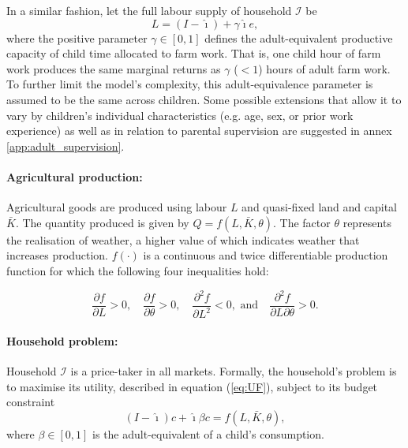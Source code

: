 \documentclass[a4paper,12pt]{article}
\theoremstyle{plain}
\theoremstyle{definition}
\theoremstyle{definition}
\theoremstyle{definition}
\theoremstyle{definition}
\begin{document}
In a similar fashion, let the full labour supply of household $\mathcal{I}$ be
\begin{equation}
    L=(I-\hat{\imath})+\gamma \hat{\imath}e,
\end{equation}
where the positive parameter $\gamma\in[0,1]$ defines the adult-equivalent productive capacity of child time allocated to farm work. That is, one child hour of farm work produces the same marginal returns as $\gamma$ ($<1$) hours of adult farm work. To further limit the model's complexity, this adult-equivalence parameter is assumed to be the same across children. Some possible extensions that allow it to vary by children's individual characteristics (e.g. age, sex, or prior work experience) as well as in relation to parental supervision are suggested in annex \ref{app:adult_supervision}.

\paragraph{Agricultural production:}
Agricultural goods are produced using labour $L$ and quasi-fixed land and capital $\bar{K}$. The quantity produced is given by $Q=f(L,\bar{K},\theta)$. The factor $\theta$ represents the realisation of weather, a higher value of which indicates weather that increases production.  $f(\cdot)$ is a continuous and twice differentiable production function for which the following four inequalities hold:

\begin{equation}
\label{curvature}
    \frac{\partial f}{\partial L}>0, \quad \frac{\partial f}{\partial \theta}>0, \quad \frac{\partial^2 f}{\partial L^2}<0, \text{ and} \quad \frac{\partial^2 f}{\partial L \partial \theta}>0.
\end{equation}

\paragraph{Household problem:}

Household $\mathcal{I}$ is a price-taker in all markets. Formally, the household's problem is to maximise its utility, described in equation (\ref{eq:UF}), subject to its budget constraint
\begin{equation}
\label{eq:BudgetConstraint}
    (I-\hat{\imath})c+\hat{\imath}\beta c = f(L, \bar{K}, \theta),
\end{equation}
where $\beta\in[0,1]$ is the adult-equivalent of a child's consumption.
\end{document}
